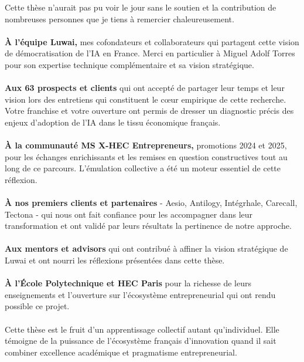 Cette thèse n'aurait pas pu voir le jour sans le soutien et la contribution de nombreuses personnes que je tiens à remercier chaleureusement.
\\\\
\textbf{À l'équipe Luwai,} mes cofondateurs et collaborateurs qui partagent cette vision de démocratisation de l'IA en France. Merci en particulier à Miguel Adolf Torres pour son expertise technique complémentaire et sa vision stratégique.
\\\\
\textbf{Aux 63 prospects et clients} qui ont accepté de partager leur temps et leur vision lors des entretiens qui constituent le cœur empirique de cette recherche. Votre franchise et votre ouverture ont permis de dresser un diagnostic précis des enjeux d'adoption de l'IA dans le tissu économique français.
\\\\
\textbf{À la communauté MS X-HEC Entrepreneurs,} promotions 2024 et 2025, pour les échanges enrichissants et les remises en question constructives tout au long de ce parcours. L'émulation collective a été un moteur essentiel de cette réflexion.
\\\\
\textbf{À nos premiers clients et partenaires} - Aesio, Antilogy, Intégrhale, Carecall, Tectona - qui nous ont fait confiance pour les accompagner dans leur transformation et ont validé par leurs résultats la pertinence de notre approche.
\\\\
\textbf{Aux mentors et advisors} qui ont contribué à affiner la vision stratégique de Luwai et ont nourri les réflexions présentées dans cette thèse.
\\\\
\textbf{À l'École Polytechnique et HEC Paris} pour la richesse de leurs enseignements et l'ouverture sur l'écosystème entrepreneurial qui ont rendu possible ce projet.
\\\\
Cette thèse est le fruit d'un apprentissage collectif autant qu'individuel. Elle témoigne de la puissance de l'écosystème français d'innovation quand il sait combiner excellence académique et pragmatisme entrepreneurial.
